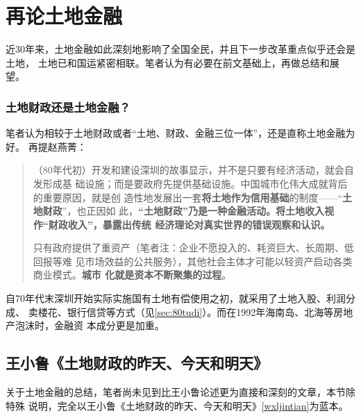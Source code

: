 \chapter{再论土地金融}

近30年来，土地金融如此深刻地影响了全国全民，并且下一步改革重点似乎还会是土地，
土地已和国运紧密相联。笔者认为有必要在前文基础上，再做总结和展望。

\subsection{土地财政还是土地金融？}

笔者认为相较于土地财政或者“土地、财政、金融三位一体”，还是直称土地金融为好。
再提赵燕菁：
\begin{quotation}
  （80年代初）开发和建设深圳的故事显示，并不是只要有经济活动，就会自发形成基
  础设施；而是要政府先提供基础设施。中国城市化伟大成就背后的重要原因，就是创
  造性地发展出一套\textbf{将土地作为信用基础}的制度——“\textbf{土地财政}”，也正因如
  此，\textbf{“土地财政”乃是一种金融活动。将土地收入视作“财政收入”，暴露出传统
    经济理论对真实世界的错误观察和认识。}

  只有政府提供了重资产（笔者注：企业不愿投入的、耗资巨大、长周期、低回报等难
  见市场效益的公共服务），其他社会主体才可能以轻资产启动各类商业模式。\textbf{城市
    化就是资本不断聚集的过程}。
\end{quotation}
自70年代末深圳开始实际实施国有土地有偿使用之初，就采用了土地入股、利润分成、
卖楼花、银行信贷等方式（见\cref{sec:80tudi}）。而在1992年海南岛、北海等房地产泡沫时，金融资
本成分更是加重。

\section{王小鲁《土地财政的昨天、今天和明天》}

关于土地金融的总结，笔者尚未见到比王小鲁论述更为直接和深刻的文章，本节除特殊
说明，完全以王小鲁《土地财政的昨天、今天和明天》\cref{wxljintian}为蓝本。


